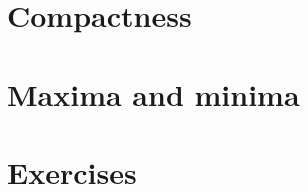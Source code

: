 \documentclass[12 pt]{article}
\numberwithin{equation}{section}
\begin{document}
{\section{Compactness}



















\section{Maxima and minima}
















\section{Exercises}



}
\end{document}
